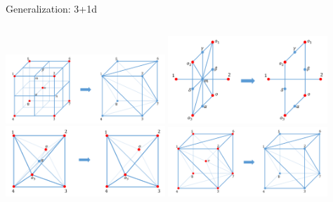 \documentclass{fdubeamer}
\begin{document}
\begin{frame}{Generalization: 3+1d}
\begin{columns}[c]
    \centering
    \includegraphics[width=0.45\textwidth]{images/holographic/rg-3+1d.png} \quad
    \includegraphics[width=0.45\textwidth]{images/holographic/rg-3+1d-step-1.png} \\
    \includegraphics[width=0.45\textwidth]{images/holographic/rg-3+1d-step-2.png} \quad
    \includegraphics[width=0.45\textwidth]{images/holographic/rg-3+1d-step-3.png}

\end{columns}

\end{frame}
\end{document}
